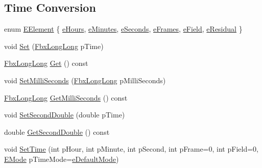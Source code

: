 \subsection*{Time Conversion}
\begin{DoxyCompactItemize}
\item 
enum \hyperlink{class_fbx_time_aebc9578f91df69fa2937911047893014}{E\+Element} \{ \newline
\hyperlink{class_fbx_time_aebc9578f91df69fa2937911047893014a36dcb336a5c973e01b05485374f13acf}{e\+Hours}, 
\hyperlink{class_fbx_time_aebc9578f91df69fa2937911047893014af8b81ffba11aa001a6ded9cd5411ee2e}{e\+Minutes}, 
\hyperlink{class_fbx_time_aebc9578f91df69fa2937911047893014a721b2eec10f5eca781126ef8b8b74eb6}{e\+Seconds}, 
\hyperlink{class_fbx_time_aebc9578f91df69fa2937911047893014aa7c5380a8b2b3a7588251708683d989f}{e\+Frames}, 
\newline
\hyperlink{class_fbx_time_aebc9578f91df69fa2937911047893014a7cf96280cc185a36becd96cc9b29f7e0}{e\+Field}, 
\hyperlink{class_fbx_time_aebc9578f91df69fa2937911047893014afa3e25da7c67c86c56bd596f016c9842}{e\+Residual}
 \}
\item 
void \hyperlink{class_fbx_time_ae5d5d3624a3dc7f24fe991f21df4f91b}{Set} (\hyperlink{fbxtypes_8h_ac34da60c22b0a7e1156e5480da7d71f1}{Fbx\+Long\+Long} p\+Time)
\item 
\hyperlink{fbxtypes_8h_ac34da60c22b0a7e1156e5480da7d71f1}{Fbx\+Long\+Long} \hyperlink{class_fbx_time_a17447886f905390b991a2d48ddb5a375}{Get} () const
\item 
void \hyperlink{class_fbx_time_a7105d8b5b0665d82660f5ef749cd6274}{Set\+Milli\+Seconds} (\hyperlink{fbxtypes_8h_ac34da60c22b0a7e1156e5480da7d71f1}{Fbx\+Long\+Long} p\+Milli\+Seconds)
\item 
\hyperlink{fbxtypes_8h_ac34da60c22b0a7e1156e5480da7d71f1}{Fbx\+Long\+Long} \hyperlink{class_fbx_time_a221649a9e998cd387df4116068322553}{Get\+Milli\+Seconds} () const
\item 
void \hyperlink{class_fbx_time_aa67980a4f73f7914d0c457384754da0c}{Set\+Second\+Double} (double p\+Time)
\item 
double \hyperlink{class_fbx_time_a11db10305535e388b8b2afb1b2bb89e6}{Get\+Second\+Double} () const
\item 
void \hyperlink{class_fbx_time_ae57387b2c14de574b1b7d4361babf033}{Set\+Time} (int p\+Hour, int p\+Minute, int p\+Second, int p\+Frame=0, int p\+Field=0, \hyperlink{class_fbx_time_acc529b00a0e8d4c3da3702449ca93031}{E\+Mode} p\+Time\+Mode=\hyperlink{class_fbx_time_acc529b00a0e8d4c3da3702449ca93031a1490a2efc4429bf125761d75f2aa06a6}{e\+Default\+Mode})

\end{DoxyCompactItemize}
